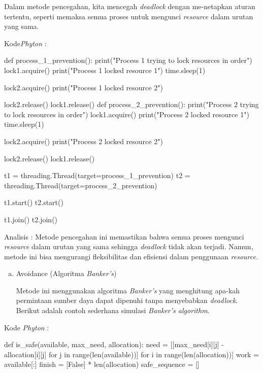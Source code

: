 \documentclass[12pt]{article}
\begin{document}
\begin{enumerate}
\begin{enumerate}[a.]
        Dalam metode pencegahan, kita mencegah \textit{deadlock} dengan me-netapkan aturan tertentu, seperti memaksa semua proses untuk mengunci \textit{resource} dalam urutan yang sama.
    \end{enumerate}

    Kode\textit{Phyton} :

    \begin{python}
def process_1_prevention():
    print("Process 1 trying to lock resources in order")
    lock1.acquire()
    print("Process 1 locked resource 1")
    time.sleep(1)
    
    lock2.acquire()
    print("Process 1 locked resource 2")
    
    lock2.release()
    lock1.release()
def process_2_prevention():
    print("Process 2 trying to lock resources in order")
    lock1.acquire()
    print("Process 2 locked resource 1")
    time.sleep(1)
    
    lock2.acquire()
    print("Process 2 locked resource 2")
    
    lock2.release()
    lock1.release()

t1 = threading.Thread(target=process_1_prevention)
t2 = threading.Thread(target=process_2_prevention)

t1.start()
t2.start()

t1.join()
t2.join()
    \end{python}

    Analisis : Metode pencegahan ini memastikan bahwa semua proses mengunci \textit{resource} dalam urutan yang sama sehingga \textit{deadlock} tidak akan terjadi. Namun, metode ini bisa mengurangi fleksibilitas dan efisiensi dalam penggunaan \textit{resource.}

    \begin{enumerate}[b.]
        \item {Avoidance} (Algoritma \textit{Banker's})

        Metode ini menggunakan algoritma \textit{Banker's} yang menghitung apa-kah permintaan sumber daya dapat dipenuhi tanpa menyebabkan \textit{deadlock}. Berikut adalah contoh sederhana simulasi \textit{Banker's algorithm.}
    \end{enumerate}

        Kode \textit{Phyton} :

        \begin{python}
def is_safe(available, max_need, allocation):
    need = [[max_need[i][j] - allocation[i][j] for j in range(len(available))] for i in range(len(allocation))]
    work = available[:]
    finish = [False] * len(allocation)
    safe_sequence = []


\end{python}
\end{enumerate}
\end{document}
